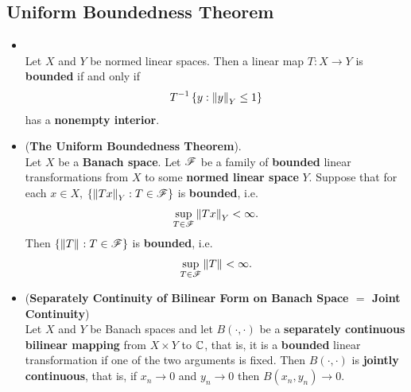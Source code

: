 \documentclass[11pt]{article}
\begin{document}
\subsection{Uniform Boundedness Theorem}
\begin{itemize}
\item \begin{proposition}\label{prop: bounded_non_empty_int} \citep{reed1980methods}\\
Let $X$ and $Y$ be normed linear spaces. Then a linear map  $Τ: X\rightarrow Y$ is \textbf{bounded} if and only if 
\begin{align*}
T^{-1}\left\{y: \left\|y\right\|_{Y} \le 1\right\}
\end{align*} has a \textbf{nonempty interior}. 
\end{proposition}


\item \begin{theorem} (\textbf{The Uniform Boundedness Theorem}). \citep{reed1980methods} \\
Let $X$ be a \textbf{Banach space}. Let ${\mathscr F}$ be a family of \textbf{bounded} linear transformations from $X$ to some \textbf{normed linear space} $Y$. Suppose that for each $x \in X$, $\left\{\left\|Tx\right\|_{Y}:  T \in {\mathscr F}\right\}$ is  \textbf{bounded}, i.e.
\begin{align*}
\sup_{T \in {\mathscr F}}\left\|Tx\right\|_{Y} < \infty.
\end{align*} Then $\left\{\left\|T\right\|_{}: T \in {\mathscr F}\right\}$ is \textbf{bounded}, i.e.
\begin{align*}
\sup_{T \in {\mathscr F}}\left\|T\right\|_{} < \infty.
\end{align*}
\end{theorem}

\item \begin{corollary} (\textbf{Separately Continuity of Bilinear Form on Banach Space $=$ Joint Continuity}) \citep{reed1980methods}\\
Let $X$ and $Y$ be Banach spaces and let $B(\cdot,  \cdot)$ be a \textbf{separately continuous bilinear mapping} from $X \times Y$ to ${\mathbb C}$, that is, it is a \textbf{bounded} linear transformation if one of the two arguments is fixed. Then $B(\cdot,  \cdot)$ is \textbf{jointly continuous}, that is, if $x_n \rightarrow 0$ and  $y_n \rightarrow 0$ then $B(x_n, y_n) \rightarrow 0$. 
\end{corollary}
\end{itemize}
\end{document}
